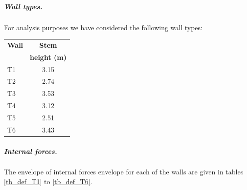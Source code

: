 \subparagraph{Wall types.}
For analysis purposes we have considered the following wall types:

\begin{center}
  \begin{tabular}{|l|c|}
    \hline
    \textbf{Wall} & \textbf{Stem} \\
    & \textbf{height (m)} \\
    \hline
T1 & 3.15\\
T2 & 2.74\\
T3 & 3.53\\
T4 & 3.12\\
T5 & 2.51\\
T6 & 3.43\\
    \hline
  \end{tabular}
\end{center}

\subparagraph{Internal forces.}
The envelope of internal forces envelope for each of the walls are given in tables \ref{tb_def_T1} to \ref{tb_def_T6}.

